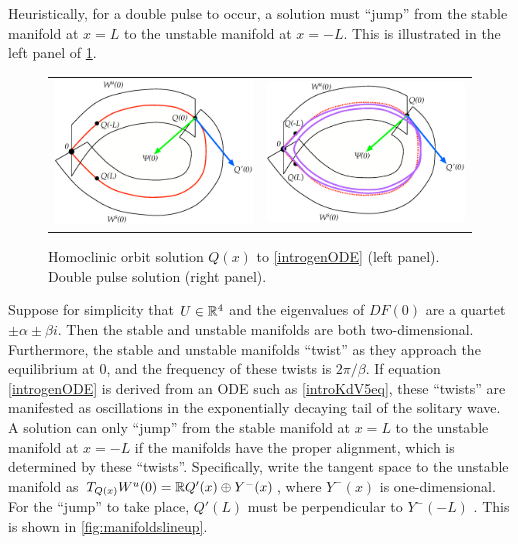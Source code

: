 \documentclass[thesis2.tex]{subfiles}
\begin{document}
Heuristically, for a double pulse to occur, a solution must ``jump'' from the stable manifold at $x = L$ to the unstable manifold at $x = -L$. This is illustrated in the left panel of \cref{fig:wswu}.
\begin{figure}
\begin{center}
\begin{tabular}{cc}
\includegraphics[width=8cm]{images/intro/WsWu} &
\includegraphics[width=8cm]{images/intro/WsWuDouble}
\end{tabular}
\caption[Homoclinic orbit and double pulse]{Homoclinic orbit solution $Q(x)$ to \cref{introgenODE} (left panel). Double pulse solution (right panel). }
\label{fig:wswu}
\end{center}
\end{figure}
Suppose for simplicity that $U \in \mathbb{R}^4$ and the eigenvalues of $DF(0)$ are a quartet $\pm \alpha \pm \beta i$. Then the stable and unstable manifolds are both two-dimensional. Furthermore, the stable and unstable manifolds ``twist'' as they approach the equilibrium at 0, and the frequency of these twists is $2 \pi / \beta$. If equation \cref{introgenODE} is derived from an ODE such as \cref{introKdV5eq}, these ``twists'' are manifested as oscillations in the exponentially decaying tail of the solitary wave. A solution can only ``jump'' from the stable manifold at $x = L$ to the unstable manifold at $x = -L$ if the manifolds have the proper alignment, which is determined by these ``twists''. Specifically, write the tangent space to the unstable manifold as $T_{Q(x)}W^u(0) = \mathbb{R} Q'(x) \oplus Y^-(x)$, where $Y^-(x)$ is one-dimensional. For the ``jump'' to take place, $Q'(L)$ must be perpendicular to $Y^-(-L)$ \cite{Sandstede1993,Sandstede2002}. This is shown in \cref{fig:manifoldslineup}.
\end{document}
